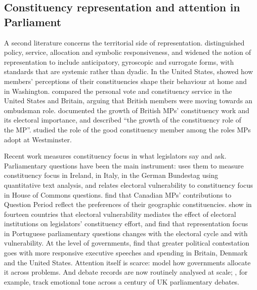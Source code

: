 \documentclass[11pt,a4paper]{article}
\begin{document}
\subsection{Constituency representation and attention in Parliament}
A second literature concerns the territorial side of representation. \citet{eulau1977} distinguished policy, service, allocation and symbolic responsiveness, and \citet{mansbridge2003} widened the notion of representation to include anticipatory, gyroscopic and surrogate forms, with standards that are systemic rather than dyadic. In the United States, \citet{fenno1978} showed how members' perceptions of their constituencies shape their behaviour at home and in Washington. \citet{cain1987} compared the personal vote and constituency service in the United States and Britain, arguing that British members were moving towards an ombudsman role. \citet{norton1993} documented the growth of British MPs' constituency work and its electoral importance, and \citet{norton1994} described ``the growth of the constituency role of the MP''. \citet{searing1985,searing1994} studied the role of the good constituency member among the roles MPs adopt at Westminster.

Recent work measures constituency focus in what legislators say and ask. Parliamentary questions have been the main instrument: \citet{martin2011} uses them to measure constituency focus in Ireland, \citet{russo2011} in Italy, \citet{zittel2019} in the German Bundestag using quantitative text analysis, and \citet{kellermann2016} relates electoral vulnerability to constituency focus in House of Commons questions. \citet{soroka2009} find that Canadian MPs' contributions to Question Period reflect the preferences of their geographic constituencies. \citet{andre2015} show in fourteen countries that electoral vulnerability mediates the effect of electoral institutions on legislators' constituency effort, and \citet{fernandes2018} find that representation focus in Portuguese parliamentary questions changes with the electoral cycle and with vulnerability. At the level of governments, \citet{hobolt2008} find that greater political contestation goes with more responsive executive speeches and spending in Britain, Denmark and the United States. Attention itself is scarce: \citet{jones2005} model how governments allocate it across problems. And debate records are now routinely analysed at scale; \citet{rheault2016}, for example, track emotional tone across a century of UK parliamentary debates.
\end{document}
